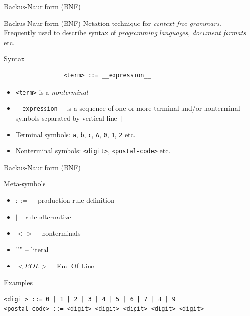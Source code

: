 \documentclass{beamer}
\begin{document}
\begin{frame}[fragile]{Backus-Naur form (BNF)}

\begin{block}{Backus-Naur form (BNF)}
Notation technique for \textit{context-free grammars}. Frequently used to describe syntax of \textit{programming languages}, \textit{document formats} etc.
\end{block}


\begin{block}{Syntax}
\begin{verbatim}
                 <term> ::= __expression__
\end{verbatim}
\vskip -0.5cm
\begin{itemize}
\item \verb|<term>| is a \textit{nonterminal}
\item \verb|__expression__| is a sequence of one or more terminal and/or nonterminal symbols separated by vertical line \verb$|$
\item Terminal symbols: \verb|a|, \verb|b|, \verb|c|, \verb|A|, \verb|0|, \verb|1|, \verb|2| etc.
\item Nonterminal symbols: \verb|<digit>|, \verb|<postal-code>| etc.
\end{itemize}
\end{block}

\end{frame}

\begin{frame}[fragile]{Backus-Naur form (BNF)}

\begin{block}{Meta-symbols}
\begin{itemize}
\item $::=$ -- production rule definition
\item $|$ -- rule alternative
\item $< >$ -- nonterminals
\item $""$ -- literal
\item $<EOL>$ -- End Of Line
\end{itemize}
\end{block}

\begin{exampleblock}{Examples}
\small
\begin{verbatim}
<digit> ::= 0 | 1 | 2 | 3 | 4 | 5 | 6 | 7 | 8 | 9
<postal-code> ::= <digit> <digit> <digit> <digit> <digit>
\end{verbatim}
\end{exampleblock}

\end{frame}
\end{document}
